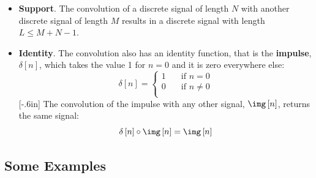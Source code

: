 \begin{itemize}
	\item {\bf Support}. The convolution of a discrete signal of length $N$ with another discrete signal of length $M$ results in a discrete signal with length $L \leq M+N-1$.

	\item {\bf Identity}. The convolution also has an identity function, that is the {\bf impulse},
	      $\delta \left[n\right]$, which takes the value 1 for $n=0$ and it is zero everywhere else:
	      \begin{equation}
		      \delta \left[n\right] =
		      \begin{cases}
			      1 & \quad \text{if } n=0      \\
			      0 & \quad \text{if } n \neq 0 \\
		      \end{cases}
	      \end{equation}
	      [-.6in]
	      The convolution of the impulse with any other signal, $\img \left[n\right]$, returns the same signal:
	      \begin{equation}
		      \delta \left[n\right] \circ \img \left[n\right] = \img \left[n\right]
	      \end{equation}
\end{itemize}

\subsection{Some Examples}

